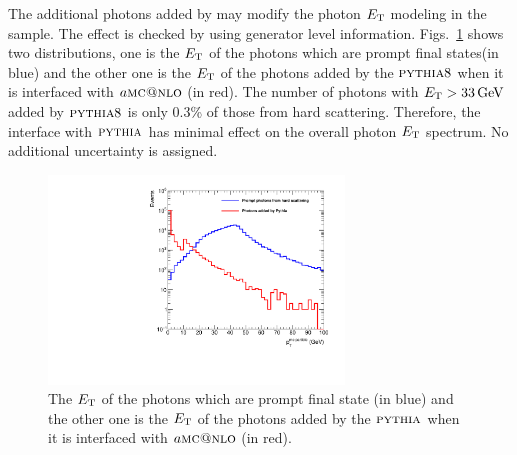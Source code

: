 The additional photons added by \PYTHIA may modify the photon $E_{\mathrm{T}}$ modeling in the sample. The effect is checked by using generator level information.
		Figs.~\ref{fig:ZGPYTHIA} shows two distributions, one is the $E_{\mathrm{T}}$ of the photons which are prompt final states\footnotemark (in blue) and the other one is the $E_{\mathrm{T}}$ of the photons added by the ${\textsc{pythia}}8$ when it is interfaced with $a\textsc{mc@nlo}$ (in red). The number of photons with $E_{\mathrm{T}} > 33 \,\text{Ge\hspace{-.08em}V}$ added by ${\textsc{pythia}}8$ is only 0.3\% of those from hard scattering. Therefore, the interface with ${\textsc{pythia}}$ has minimal effect on the overall photon $E_{\mathrm{T}}$ spectrum. No additional uncertainty is assigned.
		\begin{figure}[!ht]
		\begin{center}
		  \includegraphics[width=0.7\textwidth]{Fig/mcPt_FromMEPythia}
		  \caption{The $E_{\mathrm{T}}$ of the photons which are prompt final state (in blue) and the other one is the $E_{\mathrm{T}}$ of the photons added by the ${\textsc{pythia}}$ when it is interfaced with $a\textsc{mc@nlo}$ (in red).}
		\label{fig:ZGPYTHIA}
		\end{center}
		\end{figure}

